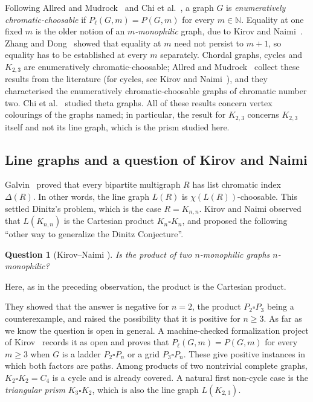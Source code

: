 \documentclass[11pt]{amsart}
\newtheorem{question}[theorem]{Question}
\theoremstyle{definition}
\theoremstyle{remark}
\newcommand{\Pl}{P_\ell}
\newcommand{\1}{\mathbf 1}
\begin{document}
Following Allred and Mudrock~\cite{AM} and Chi et al.~\cite{CLMNW}, a graph $G$ is
\emph{enumeratively chromatic-choosable} if $\Pl(G,m)=P(G,m)$ for every $m\in\mathbb N$. Equality at
one fixed $m$ is the older notion of an \emph{$m$-monophilic} graph, due to Kirov and Naimi~\cite{KN}.
Zhang and Dong~\cite{ZD26np} showed that equality at $m$ need not persist to $m+1$, so equality has to
be established at every $m$ separately. Chordal graphs, cycles and $K_{2,3}$ are enumeratively
chromatic-choosable; Allred and Mudrock~\cite[Theorem~4]{AM} collect these results from the literature
(for cycles, see Kirov and Naimi~\cite[Theorem~1]{KN}), and they characterised the enumeratively
chromatic-choosable graphs of chromatic number two. Chi et al.~\cite{CLMNW} studied theta graphs. All of
these results concern vertex colourings of the graphs named; in particular, the result for $K_{2,3}$
concerns $K_{2,3}$ itself and not its line graph, which is the prism studied here.

\subsection*{Line graphs and a question of Kirov and Naimi}
Galvin~\cite{Galvin} proved that every bipartite multigraph $R$ has list chromatic index $\Delta(R)$. In
other words, the line graph $L(R)$ is $\chi(L(R))$-choosable. This settled Dinitz's problem, which is
the case $R=K_{n,n}$. Kirov and Naimi observed that $L(K_{n,n})$ is the Cartesian product
$K_n\square K_n$, and proposed the following ``other way to generalize the Dinitz Conjecture''.

\begin{question}[{Kirov--Naimi \cite[Question~1]{KN}}]\label{q:KN}
Is the product of two $n$-monophilic graphs $n$-monophilic?
\end{question}

Here, as in the preceding observation, the product is the Cartesian product.

They showed that the answer is negative for $n=2$, the product $P_2\square P_3$ being a counterexample,
and raised the possibility that it is positive for $n\ge 3$. As far as we know the question is open in
general. A machine-checked formalization project of Kirov~\cite{KirovLean} records it as open and proves
that $\Pl(G,m)=P(G,m)$ for every $m\ge3$ when $G$ is a ladder $P_2\square P_n$ or a grid $P_3\square P_n$.
These give positive instances in which both factors are paths. Among products of two nontrivial
complete graphs, $K_2\square K_2=C_4$ is a cycle and is already covered. A natural first non-cycle case is
the \emph{triangular prism} $K_3\square K_2$, which is also the line graph $L(K_{2,3})$.
\end{document}
